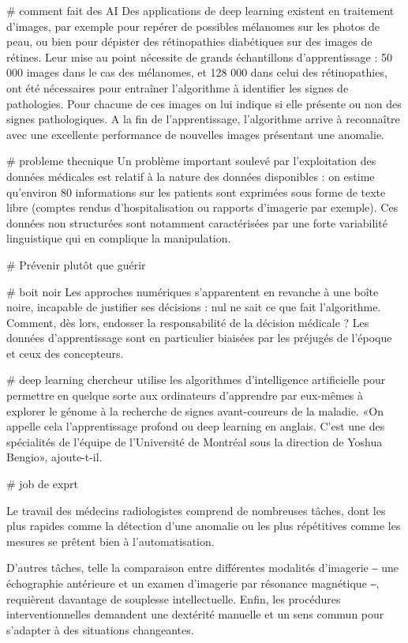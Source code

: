 # comment fait des AI
Des applications de deep learning existent en traitement d’images, par exemple
pour repérer de possibles mélanomes sur les photos de peau, ou bien pour
dépister des rétinopathies diabétiques sur des images de rétines. Leur mise au
point nécessite de grands échantillons d’apprentissage : 50 000 images dans le
cas des mélanomes, et 128 000 dans celui des rétinopathies, ont été nécessaires
pour entraîner l’algorithme à identifier les signes de pathologies. Pour
chacune de ces images on lui indique si elle présente ou non des signes
pathologiques. A la fin de l’apprentissage, l’algorithme arrive à reconnaître
avec une excellente performance de nouvelles images présentant une anomalie. 


# probleme thecnique
Un problème important soulevé par l’exploitation des données médicales est
relatif à la nature des données disponibles : on estime qu’environ 80 %
informations sur les patients sont exprimées sous forme de texte libre (comptes
rendus d’hospitalisation ou rapports d’imagerie par exemple). Ces données non
structurées sont notamment caractérisées par une forte variabilité linguistique
qui en complique la manipulation.

# Prévenir plutôt que guérir

# boit noir
Les approches numériques s’apparentent en revanche à une boîte noire, incapable
de justifier ses décisions : nul ne sait ce que fait l’algorithme. Comment, dès
lors, endosser la responsabilité de la décision médicale ? Les données
d’apprentissage sont en particulier biaisées par les préjugés de l’époque et
ceux des concepteurs.

# deep learning
chercheur utilise les algorithmes d’intelligence artificielle pour permettre en
quelque sorte aux ordinateurs d’apprendre par eux-mêmes à explorer le génome à
la recherche de signes avant-coureurs de la maladie. «On appelle cela
l’apprentissage profond ou deep learning en anglais. C’est une des spécialités
de l’équipe de l’Université de Montréal sous la direction de Yoshua Bengio»,
ajoute-t-il. 


# job de exprt

Le travail des médecins radiologistes comprend de nombreuses tâches, dont les
plus rapides comme la détection d'une anomalie ou les plus répétitives comme
les mesures se prêtent bien à l'automatisation.



D'autres tâches, telle la comparaison entre différentes modalités d'imagerie ‒
une échographie antérieure et un examen d'imagerie par résonance magnétique ‒,
requièrent davantage de souplesse intellectuelle. Enfin, les procédures
interventionnelles demandent une dextérité manuelle et un sens commun pour
s'adapter à des situations changeantes.


